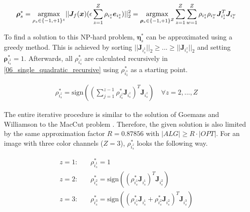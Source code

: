 \begin{equation}
\begin{aligned}
	\bm{\rho}_s^* = \operatorname*{argmax}_{\rho_s \in \{-1, +1\}^z} \lvert\lvert \bm{J}_f(\bm{x})(\epsilon \sum_{z=1}^{Z} \rho_{i_s^z} \bm{e}_{i_s^z}) \rvert\rvert_2^2 = \operatorname*{argmax}_{\bm{\rho}_s \in \{-1, +1\}^Z} \sum_{z=1}^Z \sum_{w=1}^Z \rho_{i_s^z} \rho_{i_s^w} \bm{J}_{i_s^z}^T \bm{J}_{i_s^w}
\end{aligned}
\label{06_single_quadratic_solution_rho_2}
\end{equation}

\begingroup
To find a solution to this NP-hard problem, $\bm{\eta}_s^*$ can be approximated using a greedy method. This is achieved by sorting $\lvert\lvert \bm{J}_{i_s^1} \rvert\rvert_2 \geq ... \geq \lvert\lvert \bm{J}_{i_s^z} \rvert\rvert_2$ and setting $\bm{\rho}_{i_s^1}^* = 1$.
Afterwards, all $\rho_{i_s^z}^*$ are calculated recursively in \ref{06_single_quadratic_recursive} using $\rho_{i_1^s}^*$ as a starting point.
\endgroup

\begin{equation}
\begin{aligned}
	\rho_{i_s^z}^* = \text{sign}((\sum_{j=1}^{z-1} \rho_{i_s^j}^* \bm{J}_{i_s^z})^T \bm{J}_{i_s^z}) \quad \forall z = 2, ..., Z
\end{aligned}
\label{06_single_quadratic_recursive}
\end{equation}


\begingroup
The entire iterative procedure is similar to the solution of Goemans and Williamson to the MacCut problem \cite{MaxCut}. Therefore, the given solution is also limited by the same approximation factor $R = 0.87856$ with $\lvert ALG \rvert \geq R \cdot \lvert OPT \rvert$.
For an image with three color channels ($Z=3$), $\rho_{i_s^z}^*$ looks the following way.
\endgroup

\begin{equation}
\begin{aligned}
z = 1: \quad & \rho_{i_s^1}^* = 1 \\[10pt]
z = 2: \quad & \rho_{i_s^2}^* = \text{sign}( (\rho_{i_s^1}^* \bm{J}_{i_s^1})^T \bm{J}_{i_s^2} ) \\[10pt]
z = 3: \quad & \rho_{i_s^3}^* = \text{sign}( (\rho_{i_s^1}^* \bm{J}_{i_s^1} + \rho_{i_s^2}^* \bm{J}_{i_s^2})^T \bm{J}_{i_s^3} ) \\[10pt]
\end{aligned}
\label{rho_example_z_3}
\end{equation}


